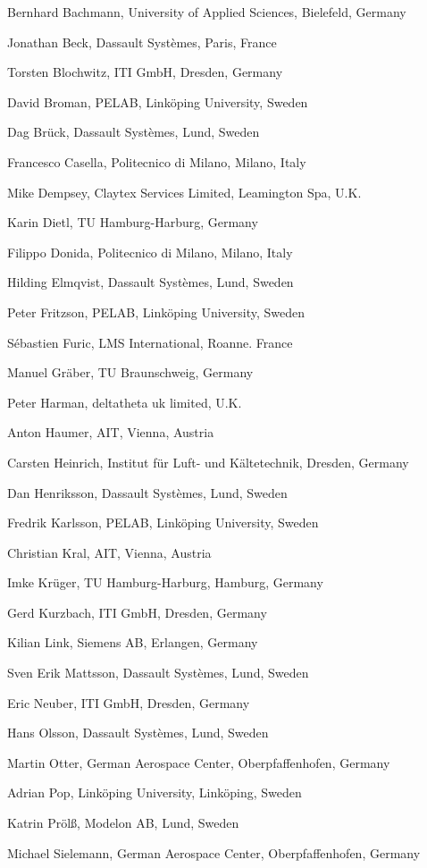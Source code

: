 Bernhard Bachmann, University of Applied Sciences, Bielefeld, Germany

Jonathan Beck, Dassault Systèmes, Paris, France

Torsten Blochwitz, ITI GmbH, Dresden, Germany

David Broman, PELAB, Linköping University, Sweden

Dag Brück, Dassault Systèmes, Lund, Sweden

Francesco Casella, Politecnico di Milano, Milano, Italy

Mike Dempsey, Claytex Services Limited, Leamington Spa, U.K.

Karin Dietl, TU Hamburg-Harburg, Germany

Filippo Donida, Politecnico di Milano, Milano, Italy

Hilding Elmqvist, Dassault Systèmes, Lund, Sweden

Peter Fritzson, PELAB, Linköping University, Sweden

Sébastien Furic, LMS International, Roanne. France

Manuel Gräber, TU Braunschweig, Germany

Peter Harman, deltatheta uk limited, U.K.

Anton Haumer, AIT, Vienna, Austria

Carsten Heinrich, Institut für Luft- und Kältetechnik, Dresden, Germany

Dan Henriksson, Dassault Systèmes, Lund, Sweden

Fredrik Karlsson, PELAB, Linköping University, Sweden

Christian Kral, AIT, Vienna, Austria

Imke Krüger, TU Hamburg-Harburg, Hamburg, Germany

Gerd Kurzbach, ITI GmbH, Dresden, Germany

Kilian Link, Siemens AB, Erlangen, Germany

Sven Erik Mattsson, Dassault Systèmes, Lund, Sweden

Eric Neuber, ITI GmbH, Dresden, Germany

Hans Olsson, Dassault Systèmes, Lund, Sweden

Martin Otter, German Aerospace Center, Oberpfaffenhofen, Germany

Adrian Pop, Linköping University, Linköping, Sweden

Katrin Prölß, Modelon AB, Lund, Sweden

Michael Sielemann, German Aerospace Center, Oberpfaffenhofen, Germany


